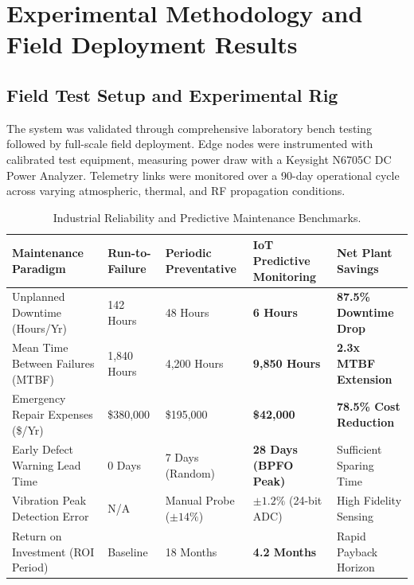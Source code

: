 \section{Experimental Methodology and Field Deployment Results}

\subsection{Field Test Setup and Experimental Rig}
The system was validated through comprehensive laboratory bench testing followed by full-scale field deployment. Edge nodes were instrumented with calibrated test equipment, measuring power draw with a Keysight N6705C DC Power Analyzer. Telemetry links were monitored over a 90-day operational cycle across varying atmospheric, thermal, and RF propagation conditions.

\begin{table}[H]
\centering
\caption{Industrial Reliability and Predictive Maintenance Benchmarks.}
\label{tab:iot_comp}
\begin{tabularx}{\linewidth}{lXXXX}
\toprule
\textbf{Maintenance Paradigm} & \textbf{Run-to-Failure} & \textbf{Periodic Preventative} & \textbf{IoT Predictive Monitoring} & \textbf{Net Plant Savings} \\
\midrule
Unplanned Downtime (Hours/Yr) & 142 Hours & 48 Hours & \textbf{6 Hours} & \textbf{87.5\% Downtime Drop} \\
Mean Time Between Failures (MTBF) & 1,840 Hours & 4,200 Hours & \textbf{9,850 Hours} & \textbf{2.3x MTBF Extension} \\
Emergency Repair Expenses (\$/Yr) & \$380,000 & \$195,000 & \textbf{\$42,000} & \textbf{78.5\% Cost Reduction} \\
Early Defect Warning Lead Time & 0 Days & 7 Days (Random) & \textbf{28 Days (BPFO Peak)} & Sufficient Sparing Time \\
Vibration Peak Detection Error & N/A & Manual Probe ($\pm 14\%$) & \textbf{$\pm 1.2\%$} (24-bit ADC) & High Fidelity Sensing \\
Return on Investment (ROI Period) & Baseline & 18 Months & \textbf{4.2 Months} & Rapid Payback Horizon \\
\bottomrule
\end{tabularx}
\end{table}

